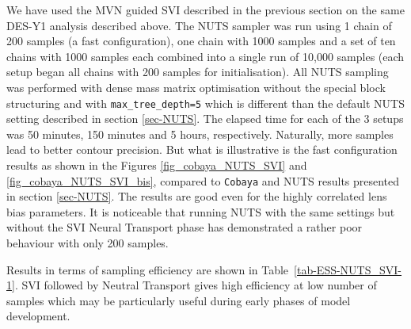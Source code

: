 \documentclass[twocolumn,twocolappendix,nofootinbib,iop]{openjournal}
\newcommand{\JZ}[1]{{\color{purple}JZ: #1}}
\newcommand{\numpyro}{\texttt{NumPyro}}
\begin{document}
%
We have used the MVN guided SVI described in the previous section on the same DES-Y1 analysis described above. The NUTS sampler was run using 1 chain of 200 samples (a fast configuration), one chain with 1000 samples and a set of ten chains with 1000 samples each combined into a single run of 10,000 samples (each setup began all chains with 200 samples for initialisation). All NUTS sampling was performed with dense mass matrix optimisation without the special block structuring and with \texttt{max\_tree\_depth=5} which is different than the default NUTS setting described in section \ref{sec-NUTS}. The elapsed time for each of the 3 setups was 50 minutes, 150 minutes and 5 hours, respectively. Naturally, more samples lead to better contour precision. But what is illustrative is the fast configuration results as shown in the Figures \ref{fig_cobaya_NUTS_SVI} and \ref{fig_cobaya_NUTS_SVI_bis}, compared to \texttt{Cobaya} and NUTS results presented in section \ref{sec-NUTS}. The results are good even for the highly correlated lens bias parameters. It is noticeable that running NUTS with the same settings  but without the SVI Neural Transport phase has demonstrated a rather poor behaviour with only 200 samples.

Results in terms of sampling efficiency are shown in Table~\ref{tab-ESS-NUTS_SVI-1}. SVI followed by Neutral Transport gives high efficiency at low number of samples which may be particularly useful during early phases of model development.
%
\end{document}
